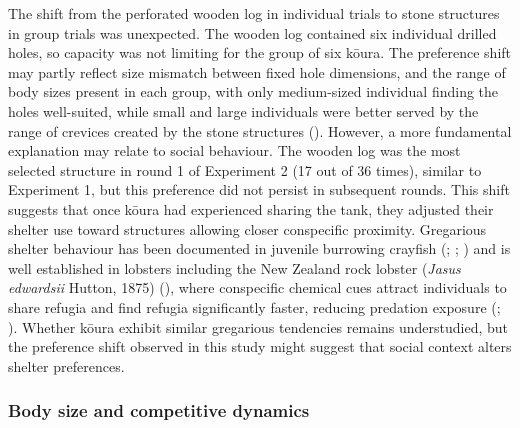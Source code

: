 \documentclass[
  letterpaper,
  DIV=11,
  numbers=noendperiod]{scrartcl}
\begin{document}
The shift from the perforated wooden log in individual trials to stone
structures in group trials was unexpected. The wooden log contained six
individual drilled holes, so capacity was not limiting for the group of
six kōura. The preference shift may partly reflect size mismatch between
fixed hole dimensions, and the range of body sizes present in each
group, with only medium-sized individual finding the holes well-suited,
while small and large individuals were better served by the range of
crevices created by the stone structures
(). However, a more
fundamental explanation may relate to social behaviour. The wooden log
was the most selected structure in round 1 of Experiment 2 (17 out of 36
times), similar to Experiment 1, but this preference did not persist in
subsequent rounds. This shift suggests that once kōura had experienced
sharing the tank, they adjusted their shelter use toward structures
allowing closer conspecific proximity. Gregarious shelter behaviour has
been documented in juvenile burrowing crayfish
(;
;
) and is well
established in lobsters including the New Zealand rock lobster
(\emph{Jasus edwardsii} Hutton, 1875) (), where conspecific chemical cues attract
individuals to share refugia and find refugia significantly faster,
reducing predation exposure (; ). Whether kōura exhibit similar gregarious tendencies
remains understudied, but the preference shift observed in this study
might suggest that social context alters shelter preferences.

\subsubsection{Body size and competitive
dynamics}\label{body-size-and-competitive-dynamics}
\end{document}
